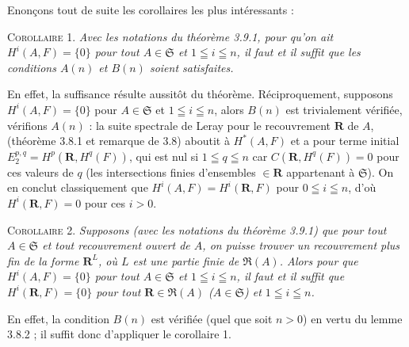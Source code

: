 Enonçons tout de suite les corollaires les plus intéressants :

\textsc{Corollaire 1.} \textit{Avec les notations du théorème \textup{3.9.1},
pour qu'on ait $H^i(A,F)=\{0\}$ pour tout $A\in\mathfrak S$ et
$1\leqq i\leqq n$, il faut et il suffit que les conditions $A(n)$ et $B(n)$
soient satisfaites.}

En effet, la suffisance résulte aussitôt du théorème.
Réciproquement, supposons $H^i(A,F)=\{0\}$ pour $A\in\mathfrak S$ et
$1\leqq i\leqq n$, alors $B(n)$ est trivialement vérifiée, vérifions $A(n)$ :
la suite spectrale de Leray pour le recouvrement $\mathbf R$ de $A$,
(théorème 3.8.1 et remarque de 3.8) aboutit à $H^*(A,F)$ et a pour terme
initial
$E_2^{p,q}=H^p(\mathbf R,H^q(F))$,
qui est nul si $1\leqq q\leqq n$ car $C(\mathbf R,H^q(F))=0$ pour ces valeurs
de $q$ (les intersections finies d'ensembles $\in\mathbf R$ appartenant à
$\mathfrak S$). On en conclut classiquement que
$H^i(A,F)=H^i(\mathbf R,F)$ pour $0\leqq i\leqq n$, d'où
$H^i(\mathbf R,F)=0$ pour ces $i>0$.

\textsc{Corollaire 2.} \textit{Supposons \textup{(}avec les notations du
théorème \textup{3.9.1)} que pour tout $A\in\mathfrak S$ et tout recouvrement ouvert de
$A$, on puisse trouver un recouvrement plus fin de la forme $\mathbf R^L$, où
$L$ est une partie finie de $\mathfrak R(A)$. Alors pour que
$H^i(A,F)=\{0\}$ pour tout $A\in\mathfrak S$ et $1\leqq i\leqq n$, il faut et
il suffit que $H^i(\mathbf R,F)=\{0\}$ pour tout
$\mathbf R\in\mathfrak R(A)$ \textup{(}$A\in\mathfrak S$\textup{)} et $1\leqq i\leqq n$.}

En effet, la condition $B(n)$ est vérifiée (quel que soit $n>0$) en vertu du
lemme 3.8.2 ; il suffit donc d'appliquer le corollaire 1.

